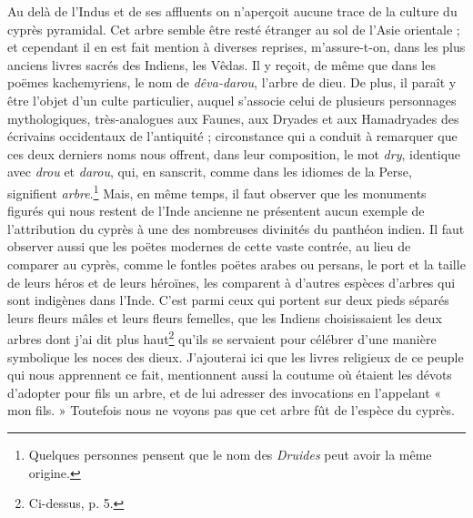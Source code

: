 \documentclass[a4paper, 11pt, oneside, polutonikogreek, french]{article}
\begin{document}
Au delà de l'Indus et de ses affluents on n'aperçoit aucune trace de la culture du cyprès pyramidal. Cet arbre semble être resté étranger au sol de l'Asie orientale ; et cependant il en est fait mention à diverses reprises, m'assure-t-on, dans les plus anciens livres sacrés des Indiens, les Vêdas. Il y reçoit, de même que dans les poëmes kachemyriens, le nom de \emph{dêva-darou}, l'arbre de dieu. De plus, il paraît y être l'objet d'un culte particulier, auquel s'associe celui de plusieurs personnages mythologiques, très-analogues aux Faunes, aux Dryades et aux Hamadryades des écrivains occidentaux de l'antiquité ; circonstance qui a conduit à remarquer que ces deux derniers noms nous offrent, dans leur composition, le mot \emph{dry}, identique avec \emph{drou} et \emph{darou}, qui, en sanscrit, comme dans les idiomes de la Perse, signifient \emph{arbre}.\footnote{Quelques personnes pensent que le nom des \emph{Druides} peut avoir la même origine.} Mais, en même temps, il faut observer que les monuments figurés qui nous restent de l'Inde ancienne ne présentent aucun exemple de l'attribution du cyprès à une des nombreuses divinités du panthéon indien. Il faut observer aussi que les poëtes modernes de cette vaste contrée, au lieu de comparer au cyprès, comme le fontles poëtes arabes ou persans, le port et la taille de leurs héros et de leurs héroïnes, les comparent à d'autres espèces d'arbres qui sont indigènes dans l'Inde. C'est parmi ceux qui portent sur deux pieds séparés leurs fleurs mâles et leurs fleurs femelles, que les Indiens choisissaient les deux arbres dont j'ai dit plus haut\footnote{Ci-dessus, p. 5.} qu'ils se servaient pour célébrer d'une manière symbolique les noces des dieux. J'ajouterai ici que les livres religieux de ce peuple qui nous apprennent ce fait, mentionnent aussi la coutume où étaient les dévots d'adopter pour fils un arbre, et de lui adresser des invocations en l'appelant « mon fils. » Toutefois nous ne voyons pas que cet arbre fût de l'espèce du cyprès.
\end{document}
